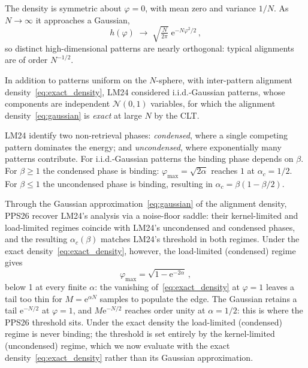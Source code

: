 \documentclass[letterpaper]{article} %
\newcommand{\e}{{\mathrm{e}}}
\newcommand{\Bnet}{\beta}
\begin{document}
The density is symmetric about $\varphi=0$, with mean zero and variance $1/N$. As $N\to\infty$ it approaches a Gaussian,
\begin{equation}
    h(\varphi)\;\longrightarrow \;\sqrt{\tfrac{N}{2\pi}} \; \e^{-N\varphi^2/2}\,,
    \label{eq:gaussian} 
\end{equation}
so distinct high-dimensional patterns are nearly orthogonal: typical alignments are of order $N^{-1/2}$. 

In addition to patterns uniform on the $N$-sphere, with inter-pattern alignment density~\eqref{eq:exact_density}, LM24 considered i.i.d.-Gaussian patterns, whose components are independent $\mathcal N(0,1)$ variables, for which the alignment density~\eqref{eq:gaussian} is \textit{exact} at large $N$ by the CLT. 

LM24 identify two non-retrieval phases: \textit{condensed}, where a single competing pattern dominates the energy; and \textit{uncondensed}, where exponentially many patterns contribute. For i.i.d.-Gaussian patterns the binding phase depends on $\Bnet$. For $\Bnet \geq 1$ the condensed phase is binding: $\varphi_{\max} = \sqrt{2\alpha}$ reaches $1$ at $\alpha_c = 1/2$. For $\Bnet \leq 1$ the uncondensed phase is binding, resulting in $\alpha_c = \Bnet(1 - \Bnet/2)$.

Through the Gaussian approximation~\eqref{eq:gaussian} of the alignment density, PPS26 recover LM24's analysis via a noise-floor saddle: their kernel-limited and load-limited regimes coincide with LM24's uncondensed and condensed phases, and the resulting $\alpha_c(\Bnet)$ matches LM24's threshold in both regimes. Under the exact density~\eqref{eq:exact_density}, however, the load-limited (condensed) regime gives
\begin{equation}
    \varphi_{\max} = \sqrt{1 - \e^{-2\alpha}}\,,
    \label{eq:varphi_max}
\end{equation}
below 1 at every finite $\alpha$: the vanishing of~\eqref{eq:exact_density} at $\varphi = 1$ leaves a tail too thin for $M = \e^{\alpha N}$ samples to populate the edge. The Gaussian retains a tail $\e^{-N/2}$ at $\varphi = 1$, and $M \e^{-N/2}$ reaches order unity at $\alpha = 1/2$: this is where the PPS26 threshold sits. Under the exact density the load-limited (condensed) regime is never binding; the threshold is set entirely by the kernel-limited (uncondensed) regime, which we now evaluate with the exact density~\eqref{eq:exact_density} rather than its Gaussian approximation.
\end{document}
